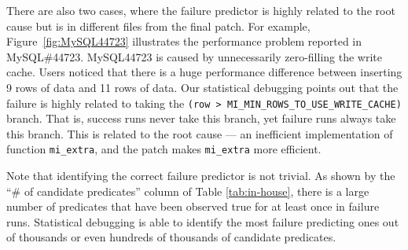 There are also two cases, where the failure predictor is highly related to the
root cause but is in different files from the final patch.
For example, Figure~\ref{fig:MySQL44723} illustrates the performance problem
reported in MySQL\#44723.
MySQL44723 is caused by unnecessarily zero-filling the write cache. 
Users noticed that there is a huge performance difference between 
inserting 9 rows of data and 11 rows of data.
Our statistical debugging points out that the failure is highly
related to taking the
\texttt{(row > MI\_MIN\_ROWS\_TO\_USE\_WRITE\_CACHE)} branch.
That is, success runs never take this branch, yet failure runs always
take this branch.
This is related to the root cause --- an inefficient implementation
of function \texttt{mi\_extra}, and the patch makes \texttt{mi\_extra}
more efficient.

Note that identifying the correct failure predictor is not trivial.
As shown by the ``\# of candidate predicates'' column
of Table \ref{tab:in-house}, there is a large number of predicates that
have been observed true for at least once in failure runs.
Statistical debugging is able to identify the most failure predicting ones
out of thousands or even hundreds of thousands of candidate predicates.

